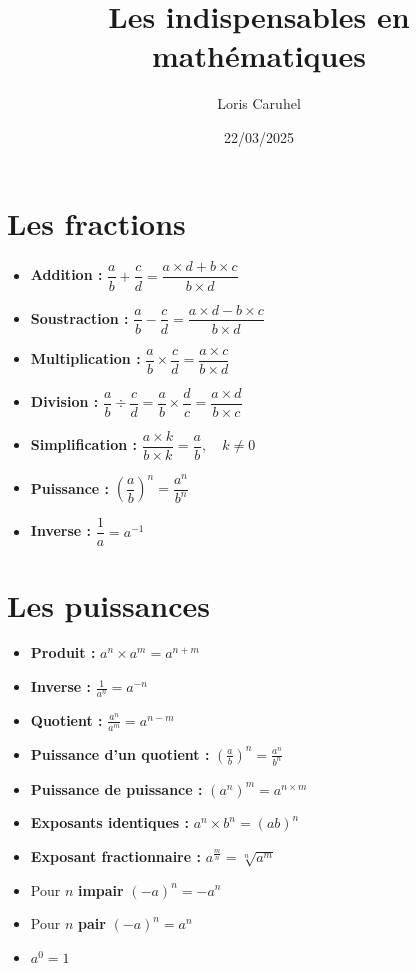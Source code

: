 \documentclass[12]{article}%
\title{\LARGE\textbf{Les indispensables en mathématiques}}
\author{Loris Caruhel}
\date{22/03/2025}
\theoremstyle{plain}
\theoremstyle{definition}
\theoremstyle{remark}
\begin{document}
\maketitle
\newpage

\large
\tableofcontents
\newpage

\section{Les fractions}
\large
\begin{itemize}
	\item \textbf{Addition :} \( \boxed{\dfrac{a}{b} + \dfrac{c}{d} = \dfrac{a \times d + b \times c}{b \times d}} \)
	\item \textbf{Soustraction :} \( \dfrac{a}{b} - \dfrac{c}{d} = \dfrac{a \times d - b \times c}{b \times d} \)
	\item \textbf{Multiplication :} \( \dfrac{a}{b} \times \dfrac{c}{d} = \dfrac{a \times c}{b \times d} \)
	\item \textbf{Division :} \( \dfrac{a}{b} \div \dfrac{c}{d} = \dfrac{a}{b} \times \dfrac{d}{c} = \dfrac{a \times d}{b \times c} \)
	\item \textbf{Simplification :} \( \dfrac{a \times k}{b \times k} = \dfrac{a}{b}, \quad k \neq 0 \)
	\item \textbf{Puissance :} \( \left (\dfrac{a}{b}\right )^{n} = \dfrac{a^{n}}{b^{n}} \)
	\item \textbf{Inverse :} \( \dfrac{1}{a} = a^{-1} \)
\end{itemize}
\newpage

\section{Les puissances}
\large
\begin{itemize}
	\item \textbf{Produit :} \( \boxed{a^{n}\times a^{m} = a^{n+m}} \)
	\item \textbf{Inverse :} \( \boxed{\frac{1}{a^{n}} = a^{-n}} \)
	\item \textbf{Quotient :} \( \boxed{\frac{a^{n}}{a^{m}} = a^{n-m}} \)
	\item \textbf{Puissance d'un quotient :} \( \boxed{\left( \frac{a}{b} \right)^n = \frac{a^n}{b^n}} \)
	\item \textbf{Puissance de puissance :} \( \boxed{(a^{n})^{m}=a^{n\times m}} \)
	\item \textbf{Exposants identiques :} \( \boxed{a^{n} \times b^{n} = (ab)^{n}} \)
	\item \textbf{Exposant fractionnaire :} \( \boxed{a^{\frac{m}{n}} = \sqrt[n]{a^m}} \)
	\item Pour $n$ \textbf{impair} \( \boxed{(-a)^{n} = -a^{n}} \)
	\item Pour $n$ \textbf{pair} \( \boxed{(-a)^{n} = a^{n}} \)
	\item \( \boxed{a^{0} = 1} \)
\end{itemize}
\newpage
\end{document}
